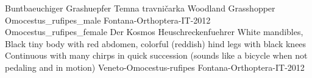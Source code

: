 {Buntbaeuchiger Grashuepfer} %
{Temna travni\v{c}arka} %
{Woodland Grasshopper} %
{Omocestus_rufipes_male} %
{Fontana-Orthoptera-IT-2012} %
{Omocestus_rufipes_female} %
{Der Kosmos Heuschreckenfuehrer} %
{White mandibles, Black tiny body with red abdomen, colorful (reddish) hind legs with black knees} %
{Continuous with many chirps in quick succession (sounds like a bicycle when not pedaling and in motion)} %
{Veneto-Omocestus-rufipes} %
{Fontana-Orthoptera-IT-2012} %

